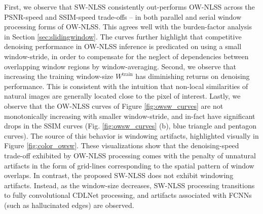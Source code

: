 \documentclass[lettersize,journal]{IEEEtran}
\newcommand{\Wtrain}{W^{\mathrm{train}}}
\begin{document}
First, we observe that SW-NLSS consistently
out-performs OW-NLSS across the PSNR-speed and SSIM-speed trade-offs -- in both
parallel and serial window processing forms of OW-NLSS. This agrees well with the burden-factor analysis in Section \ref{sec:slidingwindow}. The curves further highlight that competitive denoising performance in OW-NLSS inference is predicated on using a small window-stride, in order to compensate for the neglect of dependencies between overlapping window regions by window-averaging.
Second, we observe that increasing the training window-size $\Wtrain$ has
diminishing returns on denoising performance. This is consistent with the
intuition that non-local similarities of natural images are generally located
close to the pixel of interest. 
Lastly, we observe that the OW-NLSS curves of Figure \ref{fig:owsw_curves} are
not monotonically increasing with smaller window-stride, and in-fact have
significant drops in the SSIM curves (Fig. \ref{fig:owsw_curves} (b), blue triangle and pentagon curves). The
source of this behavior is windowing artifacts, highlighted visually in Figure
\ref{fig:color_owsw}. These visualizations show that the denoising-speed
trade-off exhibited by OW-NLSS processing comes with the penalty of unnatural
artifacts in the form of grid-lines corresponding to the spatial pattern of
window overlaps. 
In contrast, the proposed SW-NLSS does not exhibit windowing artifacts. Instead, as the window-size decreases, SW-NLSS processing transitions to fully convolutional CDLNet processing, and 
artifacts associated with FCNNs (such as hallucinated edges) are observed.
\end{document}
